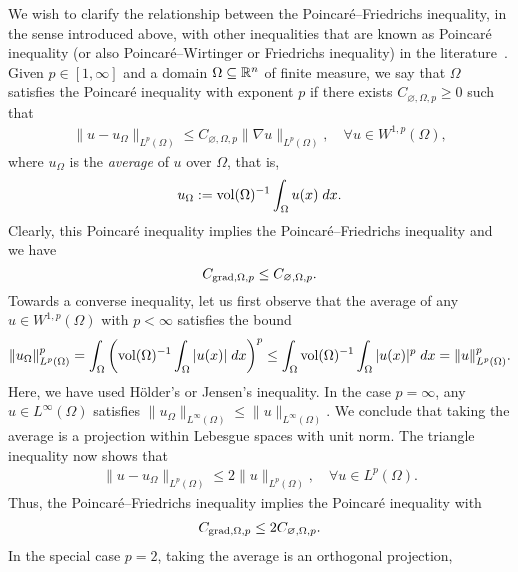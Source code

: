 \documentclass[10pt,a4paper]{article}
\begin{document}
We wish to clarify the relationship between the Poincar\'e--Friedrichs inequality, in the sense introduced above, with other inequalities that are known as Poincar\'e inequality (or also Poincar\'e--Wirtinger or Friedrichs inequality) in the literature~\cite[Remark~3.32]{ern2021finite}. Given $p \in [1,\infty]$ and a domain $\Omega \subseteq {\mathbb R}^{n}$ of finite measure, 
we say that $\Omega$ satisfies the Poincar\'e inequality with exponent $p$ 
if there exists $C_{\varnothing,\Omega,p} \geq 0$ such that 
\begin{align*}
    \| u - u_{\Omega} \|_{L^{p}(\Omega)}
    \leq 
    C_{\varnothing,\Omega,p} 
    \| \nabla u \|_{L^{p}(\Omega)}
    ,
    \quad 
    \forall u \in W^{1,p}(\Omega)
    ,
\end{align*}
where $u_{\Omega}$ is the \emph{average} of $u$ over $\Omega$, that is,
\begin{align*}
    u_{\Omega} := \operatorname{vol}(\Omega)^{-1} \int_{\Omega} u(x) \;dx.
\end{align*}
Clearly, this Poincar\'e inequality implies the Poincar\'e--Friedrichs inequality and we have 
\[
    C_{\operatorname{grad},\Omega,p} \leq C_{\varnothing,\Omega,p}.
\]
Towards a converse inequality, 
let us first observe that the average of any $u \in W^{1,p}(\Omega)$ with $p < \infty$ satisfies the bound 
\begin{align} \label{math:aver_norm}
    \| u_\Omega \|_{L^{p}(\Omega)}^{p}
    = 
    \int_{\Omega} \left( \operatorname{vol}(\Omega)^{-1} \int_{\Omega} |u(x)| \;dx \right)^{p}
    \leq 
    \int_{\Omega} \operatorname{vol}(\Omega)^{-1} \int_{\Omega} |u(x)|^{p} \;dx
    = 
    \| u \|_{L^{p}(\Omega)}^{p}
    .
\end{align}
Here, we have used H\"older's or Jensen's inequality. 
In the case $p = \infty$, any $u \in L^{\infty}(\Omega)$ satisfies $\| u_\Omega \|_{L^{\infty}(\Omega)} \leq \| u \|_{L^{\infty}(\Omega)}$. 
We conclude that taking the average is a projection within Lebesgue spaces with unit norm. 
The triangle inequality now shows that 
\begin{align*}
    \| u - u_\Omega \|_{L^{p}(\Omega)} 
    \leq
    2
    \| u \|_{L^{p}(\Omega)},
    \quad 
    \forall
    u \in L^{p}(\Omega)
    .
\end{align*}
Thus, the Poincar\'e--Friedrichs inequality implies the Poincar\'e inequality with 
\begin{align}\label{math:p_is_smaller_than_pf}
    C_{\operatorname{grad},\Omega,p} \leq 2 C_{\varnothing,\Omega,p}.
\end{align}
In the special case $p=2$, taking the average is an orthogonal projection, 
\end{document}

